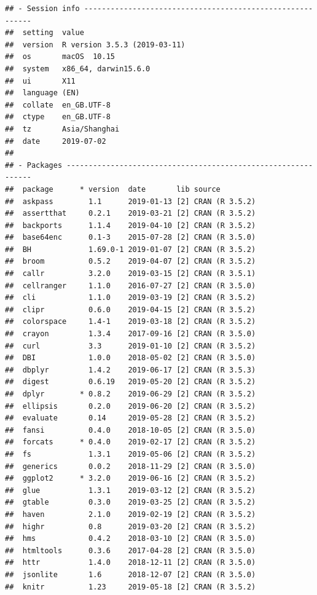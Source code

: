 \documentclass[]{book}
\begin{document}
\begin{verbatim}
## - Session info ----------------------------------------------------------
##  setting  value                       
##  version  R version 3.5.3 (2019-03-11)
##  os       macOS  10.15                
##  system   x86_64, darwin15.6.0        
##  ui       X11                         
##  language (EN)                        
##  collate  en_GB.UTF-8                 
##  ctype    en_GB.UTF-8                 
##  tz       Asia/Shanghai               
##  date     2019-07-02                  
## 
## - Packages --------------------------------------------------------------
##  package      * version  date       lib source        
##  askpass        1.1      2019-01-13 [2] CRAN (R 3.5.2)
##  assertthat     0.2.1    2019-03-21 [2] CRAN (R 3.5.2)
##  backports      1.1.4    2019-04-10 [2] CRAN (R 3.5.2)
##  base64enc      0.1-3    2015-07-28 [2] CRAN (R 3.5.0)
##  BH             1.69.0-1 2019-01-07 [2] CRAN (R 3.5.2)
##  broom          0.5.2    2019-04-07 [2] CRAN (R 3.5.2)
##  callr          3.2.0    2019-03-15 [2] CRAN (R 3.5.1)
##  cellranger     1.1.0    2016-07-27 [2] CRAN (R 3.5.0)
##  cli            1.1.0    2019-03-19 [2] CRAN (R 3.5.2)
##  clipr          0.6.0    2019-04-15 [2] CRAN (R 3.5.2)
##  colorspace     1.4-1    2019-03-18 [2] CRAN (R 3.5.2)
##  crayon         1.3.4    2017-09-16 [2] CRAN (R 3.5.0)
##  curl           3.3      2019-01-10 [2] CRAN (R 3.5.2)
##  DBI            1.0.0    2018-05-02 [2] CRAN (R 3.5.0)
##  dbplyr         1.4.2    2019-06-17 [2] CRAN (R 3.5.3)
##  digest         0.6.19   2019-05-20 [2] CRAN (R 3.5.2)
##  dplyr        * 0.8.2    2019-06-29 [2] CRAN (R 3.5.2)
##  ellipsis       0.2.0    2019-06-20 [2] CRAN (R 3.5.2)
##  evaluate       0.14     2019-05-28 [2] CRAN (R 3.5.2)
##  fansi          0.4.0    2018-10-05 [2] CRAN (R 3.5.0)
##  forcats      * 0.4.0    2019-02-17 [2] CRAN (R 3.5.2)
##  fs             1.3.1    2019-05-06 [2] CRAN (R 3.5.2)
##  generics       0.0.2    2018-11-29 [2] CRAN (R 3.5.0)
##  ggplot2      * 3.2.0    2019-06-16 [2] CRAN (R 3.5.2)
##  glue           1.3.1    2019-03-12 [2] CRAN (R 3.5.2)
##  gtable         0.3.0    2019-03-25 [2] CRAN (R 3.5.2)
##  haven          2.1.0    2019-02-19 [2] CRAN (R 3.5.2)
##  highr          0.8      2019-03-20 [2] CRAN (R 3.5.2)
##  hms            0.4.2    2018-03-10 [2] CRAN (R 3.5.0)
##  htmltools      0.3.6    2017-04-28 [2] CRAN (R 3.5.0)
##  httr           1.4.0    2018-12-11 [2] CRAN (R 3.5.0)
##  jsonlite       1.6      2018-12-07 [2] CRAN (R 3.5.0)
##  knitr          1.23     2019-05-18 [2] CRAN (R 3.5.2)

\end{verbatim}
\end{document}
